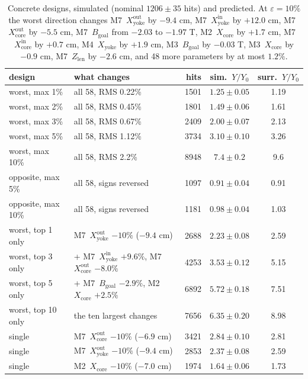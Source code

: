 \documentclass[11pt,a4paper]{article}
\newcommand{\HH}{Y/Y_0}
\begin{document}
\begin{table}[t]
\centering
\caption{Concrete designs, simulated (nominal $1206\pm35$ hits) and predicted. At
$\varepsilon=10\%$ the worst direction changes M7~$X_\mathrm{yoke}^\mathrm{out}$ by $-9.4$ cm,
M7~$X_\mathrm{yoke}^\mathrm{in}$ by $+12.0$ cm, M7~$X_\mathrm{core}^\mathrm{out}$ by $-5.5$ cm, M7~$B_\mathrm{goal}$ from $-2.03$ to $-1.97$
T, M2~$X_\mathrm{core}$ by $+1.7$ cm, M7~$X_\mathrm{core}^\mathrm{in}$ by $+0.7$ cm, M4~$X_\mathrm{yoke}$ by $+1.9$ cm,
M3~$B_\mathrm{goal}$ by $-0.03$ T, M3~$X_\mathrm{core}$ by $-0.9$ cm, M7~$Z_\mathrm{len}$ by $-2.6$ cm,
and 48 more parameters by at most $1.2\%$.}
\label{tab:concrete}
\small
\begin{tabular}{llrcc}
\toprule
design & what changes & hits & sim.\ $\HH$ & surr.\ $\HH$ \\
\midrule
worst, max 1\%   & all 58, RMS 0.22\% & 1501  & $1.25\pm0.05$ & 1.19 \\
worst, max 2\%   & all 58, RMS 0.45\% & 1801  & $1.49\pm0.06$ & 1.61 \\
worst, max 3\%   & all 58, RMS 0.67\% & 2409  & $2.00\pm0.07$ & 2.13 \\
worst, max 5\%   & all 58, RMS 1.12\% & 3734  & $3.10\pm0.10$ & 3.26 \\
worst, max 10\%  & all 58, RMS 2.2\%  & 8948  & $7.4\pm0.2$   & 9.6 \\
opposite, max 5\% & all 58, signs reversed & 1097 & $0.91\pm0.04$ & 0.91 \\
opposite, max 10\% & all 58, signs reversed & 1181 & $0.98\pm0.04$ & 1.03 \\
\midrule
worst, top 1 only  & M7~$X_\mathrm{yoke}^\mathrm{out}$ $-10\%$ ($-9.4$ cm) & 2688 & $2.23\pm0.08$ & 2.59 \\
worst, top 3 only  & + M7~$X_\mathrm{yoke}^\mathrm{in}$ $+9.6\%$, M7~$X_\mathrm{core}^\mathrm{out}$ $-8.0\%$ & 4253 & $3.53\pm0.12$ & 5.15 \\
worst, top 5 only  & + M7~$B_\mathrm{goal}$ $-2.9\%$, M2~$X_\mathrm{core}$ $+2.5\%$ & 6892 & $5.72\pm0.18$ & 7.51 \\
worst, top 10 only & the ten largest changes & 7656 & $6.35\pm0.20$ & 8.98 \\
\midrule
single & M7~$X_\mathrm{core}^\mathrm{out}$ $-10\%$ ($-6.9$ cm)  & 3421 & $2.84\pm0.10$ & 2.81 \\
single & M7~$X_\mathrm{yoke}^\mathrm{out}$ $-10\%$ ($-9.4$ cm) & 2853 & $2.37\pm0.08$ & 2.59 \\
single & M2~$X_\mathrm{core}$ $-10\%$ ($-7.0$ cm)   & 1974 & $1.64\pm0.06$ & 1.73 \\

\end{tabular}
\end{table}
\end{document}
